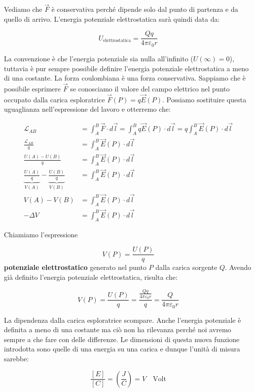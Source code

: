 Vediamo che $\vec{F}$ è conservativa perché dipende solo dal punto di partenza e da quello di arrivo. L'energia potenziale elettrostatica sarà quindi data da:

\[
	\boxed{U_{\text{elettrostatica}} = \frac{Qq}{4\pi \varepsilon_0 r}}
\]

La convenzione è che l'energia potenziale sia nulla all'infinito ($U(\infty)=0$), tuttavia è pur sempre possibile definire l'energia potenziale elettrostatica a meno di una costante.
La forza coulombiana è una forza conservativa. Sappiamo che è possibile esprimere $\vec{F}$ se conosciamo il valore del campo elettrico nel punto occupato dalla carica esploratrice $ \vec{F} (P) = q\vec{E} (P) $. Possiamo sostituire questa uguaglianza nell'espressione del lavoro e otterremo che:

\begin{align*}
	\mathcal{L}_{AB} &= \int_A^B  \vec{F} \cdot d\vec{l}  = \int_A^B  q\vec{E} (P) \cdot d\vec{l} = q \int_A^B \vec{E} (P) \cdot d\vec{l} \\
	\frac{\mathcal{L}_{AB}}{q} &= \int_A^B \vec{E} (P) \cdot d\vec{l} \\
	\frac{U(A) - U(B)}{q}&= \int_A^B \vec{E} (P) \cdot d\vec{l} \\
	\underbrace{\frac{U(A)}{q}}_{V(A)} - \underbrace{\frac{U(B)}{q}}_{V(B)} &= \int_A^B \vec{E} (P) \cdot d\vec{l} \\
	V(A) - V(B) &= \int_A^B \vec{E} (P) \cdot d\vec{l} \\
	- \Delta V &= \int_A^B \vec{E} (P) \cdot d\vec{l}
\end{align*}

Chiamiamo l'espressione

\[
	\boxed{V(P) = \frac{U(P)}{q}}
\]
\textbf{potenziale elettrostatico} generato nel punto $P$ dalla carica sorgente $Q$. Avendo già definito l'energia potenziale elettrostatica, risulta che:

\[
	V(P) = \frac{U(P)}{q} = \frac{\frac{Qq}{4\pi \varepsilon_0 r}}{q} = \frac{Q}{4\pi \varepsilon_0 r}
\]

La dipendenza dalla carica esploratrice scompare. Anche l'energia potenziale è definita a meno di una costante ma ciò non ha rilevanza perché noi avremo sempre a che fare con delle differenze. Le dimensioni di questa nuova funzione introdotta sono quelle di una energia su una carica e dunque l'unità di misura sarebbe:

\[
	\frac{[E]}{[C]} = \left( \frac{J}{C} \right) = V \quad \text{Volt}
\]

